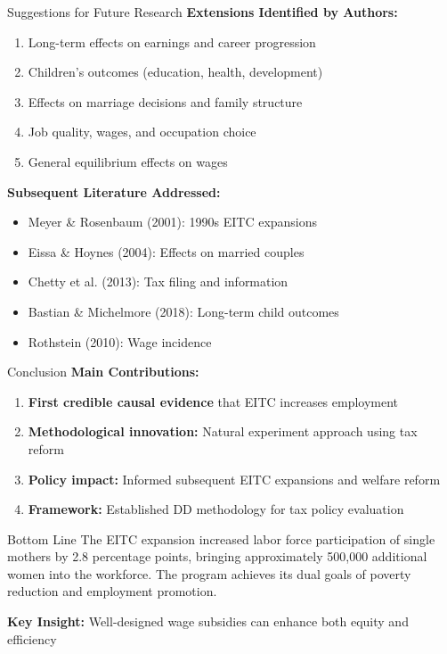 \documentclass[aspectratio=169]{beamer}
\begin{document}
\begin{frame}{Suggestions for Future Research}
\textbf{Extensions Identified by Authors:}
\begin{enumerate}
    \item Long-term effects on earnings and career progression
    \item Children's outcomes (education, health, development)
    \item Effects on marriage decisions and family structure
    \item Job quality, wages, and occupation choice
    \item General equilibrium effects on wages
\end{enumerate}

\vspace{0.3cm}
\textbf{Subsequent Literature Addressed:}
\begin{itemize}
    \item Meyer \& Rosenbaum (2001): 1990s EITC expansions
    \item Eissa \& Hoynes (2004): Effects on married couples
    \item Chetty et al. (2013): Tax filing and information
    \item Bastian \& Michelmore (2018): Long-term child outcomes
    \item Rothstein (2010): Wage incidence
\end{itemize}
\end{frame}

\begin{frame}{Conclusion}
\textbf{Main Contributions:}
\begin{enumerate}
    \item \textbf{First credible causal evidence} that EITC increases employment
    \item \textbf{Methodological innovation:} Natural experiment approach using tax reform
    \item \textbf{Policy impact:} Informed subsequent EITC expansions and welfare reform
    \item \textbf{Framework:} Established DD methodology for tax policy evaluation
\end{enumerate}

\vspace{0.5cm}
\begin{block}{Bottom Line}
The EITC expansion increased labor force participation of single mothers by 2.8 percentage points, bringing approximately 500,000 additional women into the workforce. The program achieves its dual goals of poverty reduction and employment promotion.
\end{block}

\vspace{0.3cm}
\textbf{Key Insight:} Well-designed wage subsidies can enhance both equity and efficiency
\end{frame}
\end{document}

